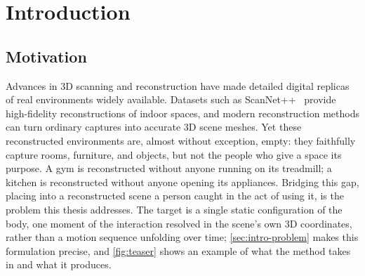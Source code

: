 \chapter{Introduction}
\label{chap:introduction}

\section{Motivation}
\label{sec:intro-motivation}

Advances in 3D scanning and reconstruction have made detailed digital replicas of real environments widely available. Datasets such as ScanNet++~\cite{yeshwanth2023scannetpp} provide high-fidelity reconstructions of indoor spaces, and modern reconstruction methods can turn ordinary captures into accurate 3D scene meshes. Yet these reconstructed environments are, almost without exception, empty: they faithfully capture rooms, furniture, and objects, but not the people who give a space its purpose. A gym is reconstructed without anyone running on its treadmill; a kitchen is reconstructed without anyone opening its appliances. Bridging this gap, placing into a reconstructed scene a person caught in the act of using it, is the problem this thesis addresses. The target is a single static configuration of the body, one moment of the interaction resolved in the scene's own 3D coordinates, rather than a motion sequence unfolding over time; \cref{sec:intro-problem} makes this formulation precise, and \cref{fig:teaser} shows an example of what the method takes in and what it produces.

